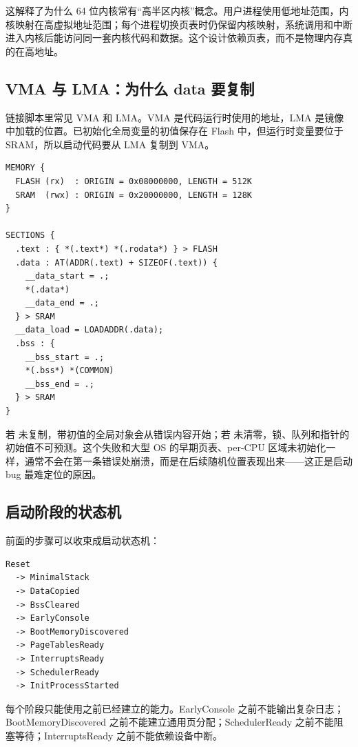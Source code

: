 这解释了为什么 64 位内核常有“高半区内核”概念。用户进程使用低地址范围，内核映射在高虚拟地址范围；每个进程切换页表时仍保留内核映射，系统调用和中断进入内核后能访问同一套内核代码和数据。这个设计依赖页表，而不是物理内存真的在高地址。

\subsection{VMA 与 LMA：为什么 data 要复制}

链接脚本里常见 VMA 和 LMA。VMA 是代码运行时使用的地址，LMA 是镜像中加载的位置。已初始化全局变量的初值保存在 Flash 中，但运行时变量要位于 SRAM，所以启动代码要从 LMA 复制到 VMA。

\begin{lstlisting}
MEMORY {
  FLASH (rx)  : ORIGIN = 0x08000000, LENGTH = 512K
  SRAM  (rwx) : ORIGIN = 0x20000000, LENGTH = 128K
}

SECTIONS {
  .text : { *(.text*) *(.rodata*) } > FLASH
  .data : AT(ADDR(.text) + SIZEOF(.text)) {
    __data_start = .;
    *(.data*)
    __data_end = .;
  } > SRAM
  __data_load = LOADADDR(.data);
  .bss : {
    __bss_start = .;
    *(.bss*) *(COMMON)
    __bss_end = .;
  } > SRAM
}
\end{lstlisting}

\begin{warningbox}
若  未复制，带初值的全局对象会从错误内容开始；若  未清零，锁、队列和指针的初始值不可预测。这个失败和大型 OS 的早期页表、per-CPU 区域未初始化一样，通常不会在第一条错误处崩溃，而是在后续随机位置表现出来——这正是启动 bug 最难定位的原因。
\end{warningbox}

\subsection{启动阶段的状态机}

前面的步骤可以收束成启动状态机：

\begin{lstlisting}
Reset
  -> MinimalStack
  -> DataCopied
  -> BssCleared
  -> EarlyConsole
  -> BootMemoryDiscovered
  -> PageTablesReady
  -> InterruptsReady
  -> SchedulerReady
  -> InitProcessStarted
\end{lstlisting}

每个阶段只能使用之前已经建立的能力。EarlyConsole 之前不能输出复杂日志；BootMemoryDiscovered 之前不能建立通用页分配；SchedulerReady 之前不能阻塞等待；InterruptsReady 之前不能依赖设备中断。

